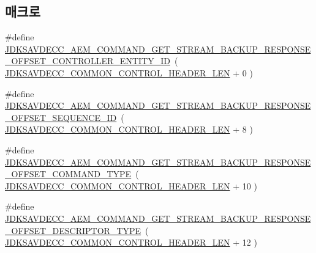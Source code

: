 \subsection*{매크로}
\begin{DoxyCompactItemize}
\item 
\#define \hyperlink{group__command__get__stream__backup__response_gab46e40eedffecd058aa7d5b53031ea5a}{J\+D\+K\+S\+A\+V\+D\+E\+C\+C\+\_\+\+A\+E\+M\+\_\+\+C\+O\+M\+M\+A\+N\+D\+\_\+\+G\+E\+T\+\_\+\+S\+T\+R\+E\+A\+M\+\_\+\+B\+A\+C\+K\+U\+P\+\_\+\+R\+E\+S\+P\+O\+N\+S\+E\+\_\+\+O\+F\+F\+S\+E\+T\+\_\+\+C\+O\+N\+T\+R\+O\+L\+L\+E\+R\+\_\+\+E\+N\+T\+I\+T\+Y\+\_\+\+ID}~( \hyperlink{group__jdksavdecc__avtp__common__control__header_gaae84052886fb1bb42f3bc5f85b741dff}{J\+D\+K\+S\+A\+V\+D\+E\+C\+C\+\_\+\+C\+O\+M\+M\+O\+N\+\_\+\+C\+O\+N\+T\+R\+O\+L\+\_\+\+H\+E\+A\+D\+E\+R\+\_\+\+L\+EN} + 0 )
\item 
\#define \hyperlink{group__command__get__stream__backup__response_gae9b28f31ea167cc1e877b9a40be41111}{J\+D\+K\+S\+A\+V\+D\+E\+C\+C\+\_\+\+A\+E\+M\+\_\+\+C\+O\+M\+M\+A\+N\+D\+\_\+\+G\+E\+T\+\_\+\+S\+T\+R\+E\+A\+M\+\_\+\+B\+A\+C\+K\+U\+P\+\_\+\+R\+E\+S\+P\+O\+N\+S\+E\+\_\+\+O\+F\+F\+S\+E\+T\+\_\+\+S\+E\+Q\+U\+E\+N\+C\+E\+\_\+\+ID}~( \hyperlink{group__jdksavdecc__avtp__common__control__header_gaae84052886fb1bb42f3bc5f85b741dff}{J\+D\+K\+S\+A\+V\+D\+E\+C\+C\+\_\+\+C\+O\+M\+M\+O\+N\+\_\+\+C\+O\+N\+T\+R\+O\+L\+\_\+\+H\+E\+A\+D\+E\+R\+\_\+\+L\+EN} + 8 )
\item 
\#define \hyperlink{group__command__get__stream__backup__response_ga3fc0a50d46d9e8f299840343f8f5cd79}{J\+D\+K\+S\+A\+V\+D\+E\+C\+C\+\_\+\+A\+E\+M\+\_\+\+C\+O\+M\+M\+A\+N\+D\+\_\+\+G\+E\+T\+\_\+\+S\+T\+R\+E\+A\+M\+\_\+\+B\+A\+C\+K\+U\+P\+\_\+\+R\+E\+S\+P\+O\+N\+S\+E\+\_\+\+O\+F\+F\+S\+E\+T\+\_\+\+C\+O\+M\+M\+A\+N\+D\+\_\+\+T\+Y\+PE}~( \hyperlink{group__jdksavdecc__avtp__common__control__header_gaae84052886fb1bb42f3bc5f85b741dff}{J\+D\+K\+S\+A\+V\+D\+E\+C\+C\+\_\+\+C\+O\+M\+M\+O\+N\+\_\+\+C\+O\+N\+T\+R\+O\+L\+\_\+\+H\+E\+A\+D\+E\+R\+\_\+\+L\+EN} + 10 )
\item 
\#define \hyperlink{group__command__get__stream__backup__response_gab7405372d0684f3f3ea49e7c3d6fa80b}{J\+D\+K\+S\+A\+V\+D\+E\+C\+C\+\_\+\+A\+E\+M\+\_\+\+C\+O\+M\+M\+A\+N\+D\+\_\+\+G\+E\+T\+\_\+\+S\+T\+R\+E\+A\+M\+\_\+\+B\+A\+C\+K\+U\+P\+\_\+\+R\+E\+S\+P\+O\+N\+S\+E\+\_\+\+O\+F\+F\+S\+E\+T\+\_\+\+D\+E\+S\+C\+R\+I\+P\+T\+O\+R\+\_\+\+T\+Y\+PE}~( \hyperlink{group__jdksavdecc__avtp__common__control__header_gaae84052886fb1bb42f3bc5f85b741dff}{J\+D\+K\+S\+A\+V\+D\+E\+C\+C\+\_\+\+C\+O\+M\+M\+O\+N\+\_\+\+C\+O\+N\+T\+R\+O\+L\+\_\+\+H\+E\+A\+D\+E\+R\+\_\+\+L\+EN} + 12 )

\end{DoxyCompactItemize}
